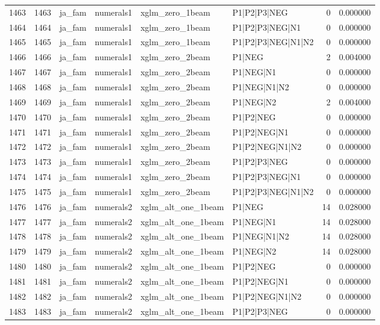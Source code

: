 \begin{tabular}{lrllllrr}
1463 & 1463 & ja_fam & numerals1 & xglm_zero_1beam & P1|P2|P3|NEG & 0 & 0.000000 \\
1464 & 1464 & ja_fam & numerals1 & xglm_zero_1beam & P1|P2|P3|NEG|N1 & 0 & 0.000000 \\
1465 & 1465 & ja_fam & numerals1 & xglm_zero_1beam & P1|P2|P3|NEG|N1|N2 & 0 & 0.000000 \\
1466 & 1466 & ja_fam & numerals1 & xglm_zero_2beam & P1|NEG & 2 & 0.004000 \\
1467 & 1467 & ja_fam & numerals1 & xglm_zero_2beam & P1|NEG|N1 & 0 & 0.000000 \\
1468 & 1468 & ja_fam & numerals1 & xglm_zero_2beam & P1|NEG|N1|N2 & 0 & 0.000000 \\
1469 & 1469 & ja_fam & numerals1 & xglm_zero_2beam & P1|NEG|N2 & 2 & 0.004000 \\
1470 & 1470 & ja_fam & numerals1 & xglm_zero_2beam & P1|P2|NEG & 0 & 0.000000 \\
1471 & 1471 & ja_fam & numerals1 & xglm_zero_2beam & P1|P2|NEG|N1 & 0 & 0.000000 \\
1472 & 1472 & ja_fam & numerals1 & xglm_zero_2beam & P1|P2|NEG|N1|N2 & 0 & 0.000000 \\
1473 & 1473 & ja_fam & numerals1 & xglm_zero_2beam & P1|P2|P3|NEG & 0 & 0.000000 \\
1474 & 1474 & ja_fam & numerals1 & xglm_zero_2beam & P1|P2|P3|NEG|N1 & 0 & 0.000000 \\
1475 & 1475 & ja_fam & numerals1 & xglm_zero_2beam & P1|P2|P3|NEG|N1|N2 & 0 & 0.000000 \\
1476 & 1476 & ja_fam & numerals2 & xglm_alt_one_1beam & P1|NEG & 14 & 0.028000 \\
1477 & 1477 & ja_fam & numerals2 & xglm_alt_one_1beam & P1|NEG|N1 & 14 & 0.028000 \\
1478 & 1478 & ja_fam & numerals2 & xglm_alt_one_1beam & P1|NEG|N1|N2 & 14 & 0.028000 \\
1479 & 1479 & ja_fam & numerals2 & xglm_alt_one_1beam & P1|NEG|N2 & 14 & 0.028000 \\
1480 & 1480 & ja_fam & numerals2 & xglm_alt_one_1beam & P1|P2|NEG & 0 & 0.000000 \\
1481 & 1481 & ja_fam & numerals2 & xglm_alt_one_1beam & P1|P2|NEG|N1 & 0 & 0.000000 \\
1482 & 1482 & ja_fam & numerals2 & xglm_alt_one_1beam & P1|P2|NEG|N1|N2 & 0 & 0.000000 \\
1483 & 1483 & ja_fam & numerals2 & xglm_alt_one_1beam & P1|P2|P3|NEG & 0 & 0.000000 \\

\end{tabular}
